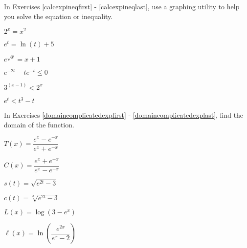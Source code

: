\documentclass{ximera}
\begin{document}
\begin{question}
In Exercises \ref{calcexpineqfirst} - \ref{calcexpineqlast},  use a graphing utility to help you solve the equation or  inequality.

\begin{problem}\label{calcexpineqfirst} 
$2^{x} = x^2$
\end{problem}  

\begin{problem}
$e^{t} = \ln(t) + 5$
\end{problem}

\begin{problem}
$e^{\sqrt{x}} = x + 1$ 
\end{problem} 

\begin{problem}
$e^{-2t}-te^{-t} \leq 0$ 
\end{problem} 

\begin{problem}
$3^{(x - 1)} < 2^{x}$
\end{problem}

\begin{problem}\label{calcexpineqlast}
$e^{t} < t^{3} - t$
\end{problem}  

\end{question}

\begin{question}
In Exercises \ref{domaincomplicatedexpfirst} - \ref{domaincomplicatedexplast},  find the domain of the function.

\begin{problem}\label{domaincomplicatedexpfirst}
$T(x) = \dfrac{e^{x} - e^{-x}}{e^{x} + e^{-x}}$
\end{problem}      

\begin{problem}
$C(x) = \dfrac{e^{x}  + e^{-x}}{e^{x}  - e^{-x}}$
\end{problem}   

\begin{problem}
$s(t) = \sqrt{e^{2t} - 3}$
\end{problem}      

\begin{problem}
$c(t) = \sqrt[3]{e^{2t} - 3}$
\end{problem}      

\begin{problem}
$L(x) = \log\left( 3 - e^{x} \right)$
\end{problem}     

\begin{problem}\label{domaincomplicatedexplast}
$\ell(x) = \ln\left( \dfrac{e^{2x}}{e^{x}-2} \right)$ 
\end{problem} 

    
\end{question}
\end{document}

